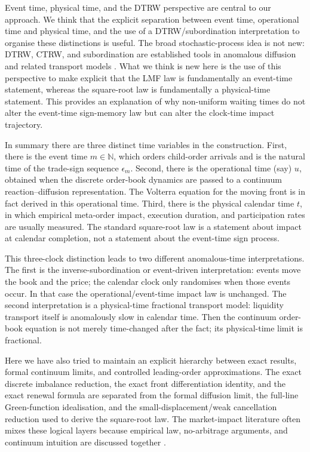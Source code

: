 \documentclass[5p,final]{elsarticle}
\begin{document}
Event time, physical time, and the DTRW perspective are central to our approach. We think that the explicit separation between event time, operational time and physical time, and the use of a DTRW/subordination interpretation to organise these distinctions is useful. The broad stochastic-process idea is not new: DTRW, CTRW, and subordination are established tools in anomalous diffusion and related transport models \citep{angstmann2015dtrw,meerschaert2012fractional,diana2024anomalous}. What we think is new here is the use of this perspective to make explicit that the LMF law is fundamentally an event-time statement, whereas the square-root law is fundamentally a physical-time statement. This provides an explanation of why non-uniform waiting times do not alter the event-time sign-memory law but can alter the clock-time impact trajectory.

In summary there are three distinct time variables in the construction.  First, there is the
event time $m\in\mathbb N$, which orders child-order arrivals and is the natural
time of the trade-sign sequence $\epsilon_m$.  Second, there is the operational
time (say) $u$, obtained when the discrete order-book dynamics are passed to a continuum
reaction--diffusion representation.  The Volterra equation for the moving front is in fact
derived in this operational time.  Third, there is the physical calendar time
$t$, in which empirical meta-order impact, execution duration, and participation rates
are usually measured.  The standard square-root law is a statement about impact at
calendar completion, not a statement about the event-time sign process.

This three-clock distinction leads to two different anomalous-time interpretations.
The first is the inverse-subordination or event-driven interpretation:
events move the book and the price; the calendar clock only randomises when those
events occur.  In that case the operational/event-time impact law is unchanged. The second interpretation is a physical-time fractional transport model:
liquidity transport itself is anomalously slow in calendar time.  Then the continuum
order-book equation is not merely time-changed after the fact; its physical-time limit
is fractional. 

Here we have also tried to maintain an explicit hierarchy between exact results, formal continuum limits, and controlled leading-order approximations. The exact discrete imbalance reduction, the exact front differentiation identity, and the exact renewal formula are separated from the formal diffusion limit, the full-line Green-function idealisation, and the small-displacement/weak cancellation reduction used to derive the square-root law. The market-impact literature often mixes these logical layers because empirical law, no-arbitrage arguments, and continuum intuition are discussed together \citep{gatheral2010nda,donier2015fully,benzaquen2018multi}. 
\end{document}
